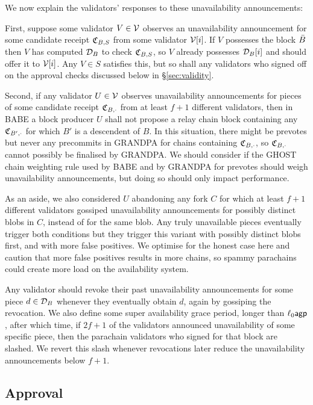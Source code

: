 We now explain the validators' responses to these unavailability announcements:

First, suppose some validator $V \in \mathcal{V}$ observes an unavailability announcement for some candidate receipt $\mathfrak{C}_{B,S}$ from some validator $\mathcal{V}[i]$.  If $V$ possesses the block $\bar{B}$ then $V$ has computed $\mathcal{D}_B$ to check $\mathfrak{C}_{B,S}$, so $V$ already possesses $\mathcal{D}_B[i]$ and should offer it to $\mathcal{V}[i]$.  Any $V \in S$ satisfies this, but so shall any validators who signed off on the approval checks discussed below in \S\ref{sec:validity}. 

Second, if any validator $U \in \mathcal{V}$ observes unavailability announcements for pieces of some candidate receipt $\mathfrak{C}_{B,\cdot}$ from at least $f+1$ different validators, then in BABE a block producer $U$ shall not propose a relay chain block containing any $\mathfrak{C}_{B',\cdot}$ for which $B'$ is a descendent of $B$.
In this situation, there might be prevotes but never any precommits in GRANDPA for chains containing  $\mathfrak{C}_{B,\cdot}$, so $\mathfrak{C}_{B,\cdot}$ cannot possibly be finalised by GRANDPA.  We should consider if the GHOST chain weighting rule used by BABE and by GRANDPA for prevotes should weigh unavailability announcements, but doing so should only impact performance.

As an aside, we also considered $U$ abandoning any fork $C$ for which at least $f+1$ different validators gossiped unavailability announcements for possibly distinct blobs in $C$, instead of for the same blob.  Any truly unavailable pieces eventually trigger both conditions but they trigger this variant with possibly distinct blobs first, and with more false positives.  We optimise for the honest case here and caution that more false positives results in more chains, so spammy parachains could create more load on the availability system.

Any validator should revoke their past unavailability announcements for some piece $d \in \mathcal{D}_B$ whenever they eventually obtain $d$, again by gossiping the revocation.  We also define some super availability grace period, longer than $\ell_0 \mathsf{agp}$, after which time, if $2f+1$ of the validators announced unavailability of some specific piece, then the parachain validators who signed for that block are slashed.
We revert this slash whenever revocations later reduce the unavailability announcements below $f+1$.


\subsection{Approval} %
\label{sec:approval}

